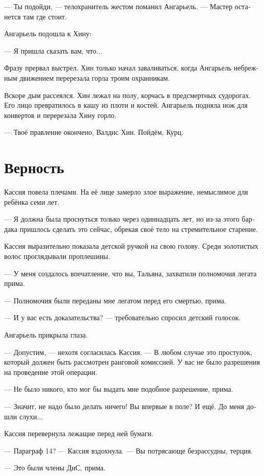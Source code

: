 \documentclass[a4paper,12pt,fleqn]{book}\usepackage{cooltooltips}\usepackage{polyglossia}\setdefaultlanguage[babelshorthands=true]{russian}\setotherlanguage{english}\defaultfontfeatures{Ligatures=TeX,Mapping=tex-text} \usepackage{xcolor}\definecolor{lightgray}{HTML}{bbbbbb}\color{lightgray}\newcommand{\ml}[3]{\textenglish{\textcolor{black}{#3}}}
\begin{document}
--- Ты подойди, --- телохранитель жестом поманил Ангарьель.
--- Мастер останется там где стоит.

Ангарьель подошла к Хину:

--- Я пришла сказать вам, что...

Фразу прервал выстрел.
Хин только начал заваливаться, когда Ангарьель небрежным движением перерезала горла троим охранникам.

Вскоре дым рассеялся.
Хин лежал на полу, корчась в предсмертных судорогах.
Его лицо превратилось в кашу из плоти и костей.
Ангарьель подняла нож для конвертов и перерезала Хину горло.

--- Твоё правление окончено, Валдис Хин.
Пойдём, Курц.

\section{Верность}

Кассия повела плечами.
На её лице замерло злое выражение, немыслимое для ребёнка семи лет.

--- Я должна была проснуться только через одиннадцать лет, но из-за этого бардака пришлось сделать это сейчас, обрекая своё тело на стремительное старение.

Кассия выразительно показала детской ручкой на свою голову.
Среди золотистых волос проглядывали проплешины.

--- У меня создалось впечатление, что вы, Тальяна, захватили полномочия легата прима.

--- Полномочия были переданы мне легатом перед его смертью, прима.

--- И у вас есть доказательства? --- требовательно спросил детский голосок.

Ангарьель прикрыла глаза.

--- Допустим, --- нехотя согласилась Кассия.
--- В любом случае это проступок, который должен быть рассмотрен ранговой комиссией.
У вас не было разрешения на проведение этой операции.

--- Не было никого, кто мог бы выдать мне подобное разрешение, прима.

--- Значит, не надо было делать ничего!
Вы впервые в поле?
И ещё.
До меня дошли слухи...

Кассия перевернула лежащие перед ней бумаги.

--- Параграф 14? --- Кассия вздохнула.
--- Вы потрясающе безрассудны, терция.

--- Это были члены ДиС, прима.
\end{document}

